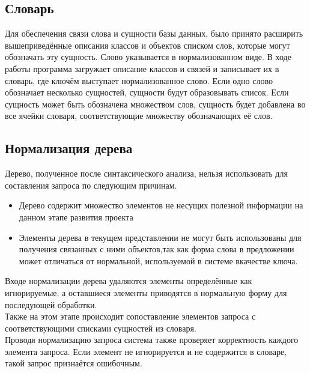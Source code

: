 \subsection{Словарь}
Для обеспечения связи слова и сущности базы данных, было принято расширить вышеприведённые описания классов и объектов списком слов, которые могут обозначать эту сущность.
Слово указывается в нормализованном виде. В ходе работы программа загружает описание классов и связей и записывает их в словарь, где ключём выступает нормализованное слово. Если одно слово обозначает несколько сущностей, сущности будут образовывать список. Если сущность может быть обозначена множеством слов, сущность будет добавлена во все ячейки словаря, соответствующие множеству обозначающих её слов.

\subsection{Нормализация дерева}
Дерево, полученное после синтаксического анализа, нельзя использовать для составления запроса по следующим причинам. 
\begin{itemize}
\item Дерево содержит множество элементов не несущих полезной информации на данном этапе развития проекта
\item Элементы дерева в текущем представлении не могут быть использованы для получения связанных с ними объектов,так как форма слова в предложении может отличаться от нормальной, используемой в системе вкачестве ключа.
\end{itemize}
Входе нормализации дерева удаляются элементы определённые как игнорируемые, а оставшиеся элементы приводятся в нормальную форму для последующей обработки.\\
Также на этом этапе происходит сопоставление элементов запроса с соответствующими списками сущностей из словаря. \\
Проводя нормализацию запроса система также проверяет корректность каждого элемента запроса. Если элемент не игнорируется и не содержится в словаре, такой запрос признаётся ошибочным.

